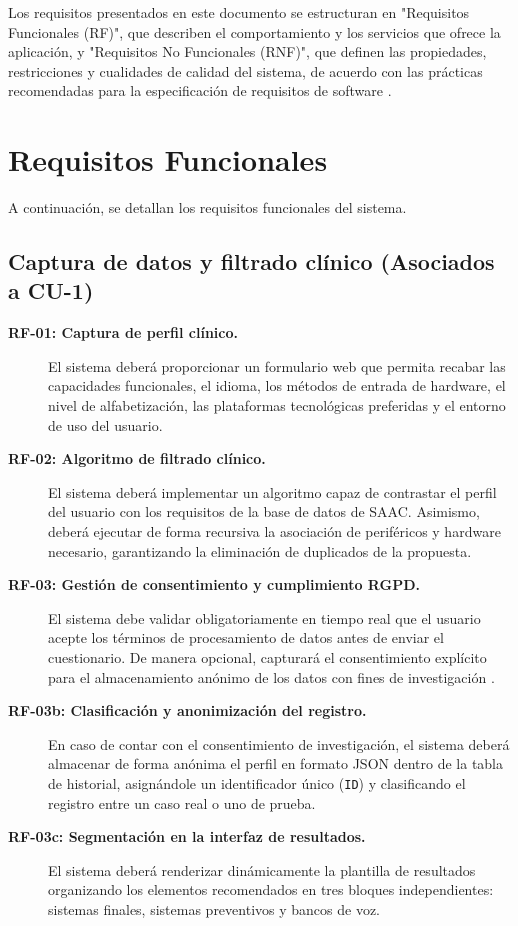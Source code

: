 
Los requisitos presentados en este documento se estructuran en "Requisitos Funcionales (RF)", que describen el comportamiento y los servicios que ofrece la aplicación, y "Requisitos No Funcionales (RNF)", que definen las propiedades, restricciones y cualidades de calidad del sistema, de acuerdo con las prácticas recomendadas para la especificación de requisitos de software \cite{ieee:srs}.

\section{Requisitos Funcionales}
A continuación, se detallan los requisitos funcionales del sistema.

\subsection{Captura de datos y filtrado clínico (Asociados a CU-1)}
\begin{description}
	\item[\textbf{RF-01: Captura de perfil clínico.}] El sistema deberá proporcionar un formulario web que permita recabar las capacidades funcionales, el idioma, los métodos de entrada de hardware, el nivel de alfabetización, las plataformas tecnológicas preferidas y el entorno de uso 		del usuario.
	\item[\textbf{RF-02: Algoritmo de filtrado clínico.}] El sistema deberá implementar un algoritmo capaz de contrastar el perfil del usuario con los requisitos de la base de datos de SAAC. Asimismo, deberá ejecutar de forma recursiva la asociación de periféricos y hardware necesario, 		garantizando la eliminación de duplicados de la propuesta.
	\item[\textbf{RF-03: Gestión de consentimiento y cumplimiento RGPD.}] El sistema debe validar obligatoriamente en tiempo real que el usuario acepte los términos de procesamiento de datos antes de enviar el cuestionario. De manera opcional, capturará el consentimiento 			explícito para el almacenamiento anónimo de los datos con fines de investigación \cite{ue:rgpd, boe:lopdgdd}.
	\item[\textbf{RF-03b: Clasificación y anonimización del registro.}] En caso de contar con el consentimiento de investigación, el sistema deberá almacenar de forma anónima el perfil en formato JSON dentro de la tabla de historial, asignándole un identificador único (\texttt{ID}) y 			clasificando el registro entre un caso real o uno de prueba.
	\item[\textbf{RF-03c: Segmentación en la interfaz de resultados.}] El sistema deberá renderizar dinámicamente la plantilla de resultados organizando los elementos recomendados en tres bloques independientes: sistemas finales, sistemas preventivos y bancos de voz.
\end{description}

